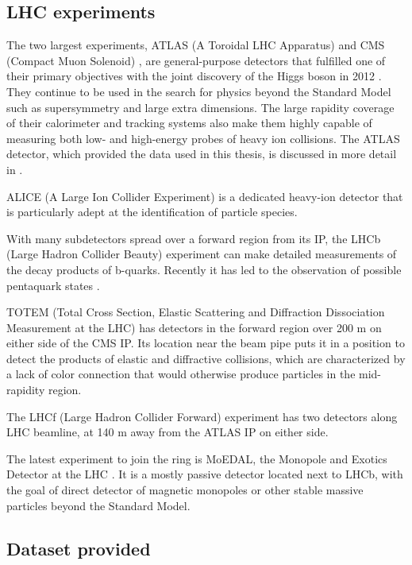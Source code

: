 \subsection{LHC experiments}
The two largest \lhc experiments, ATLAS (A Toroidal LHC Apparatus) \cite{Aad:2008zzm} and CMS (Compact Muon Solenoid) \cite{Chatrchyan:2008aa}, are general-purpose detectors that fulfilled one of their primary objectives with the joint discovery of the Higgs boson in 2012 \cite{Aad:2012tfa,Chatrchyan:2012xdj}.
They continue to be used in the search for physics beyond the Standard Model such as supersymmetry and large extra dimensions.
The large rapidity coverage of their calorimeter and tracking systems also make them highly capable of measuring both low- and high-energy probes of heavy ion collisions.
The ATLAS detector, which provided the data used in this thesis, is discussed in more detail in .

ALICE (A Large Ion Collider Experiment) \cite{Aamodt:2008zz} is a dedicated heavy-ion detector that is particularly adept at the identification of particle species.

With many subdetectors spread over a forward region from its \ac{IP}, the LHCb (Large Hadron Collider Beauty) experiment \cite{Alves:2008zz} can make detailed measurements of the decay products of b-quarks. Recently it has led to the observation of possible pentaquark states \cite{Aaij:2015tga}.

TOTEM (Total Cross Section, Elastic Scattering and Diffraction Dissociation Measurement at the LHC) \cite{Anelli:2008zza} has detectors in the forward region over 200 m on either side of the CMS \ac{IP}.
Its location near the beam pipe puts it in a position to detect the products of elastic and diffractive collisions, which are characterized by a lack of color connection that would otherwise produce particles in the mid-rapidity region.

The LHCf (Large Hadron Collider Forward) experiment \cite{Adriani:2008zz} has two detectors along LHC beamline, at 140 m away from the ATLAS \ac{IP} on either side.

The latest experiment to join the ring is MoEDAL, the Monopole and Exotics Detector at the LHC \cite{Acharya:2014nyr}.
It is a mostly passive detector located next to LHCb, with the goal of direct detector of magnetic monopoles or other stable massive particles beyond the Standard Model.

\subsection{Dataset provided}

